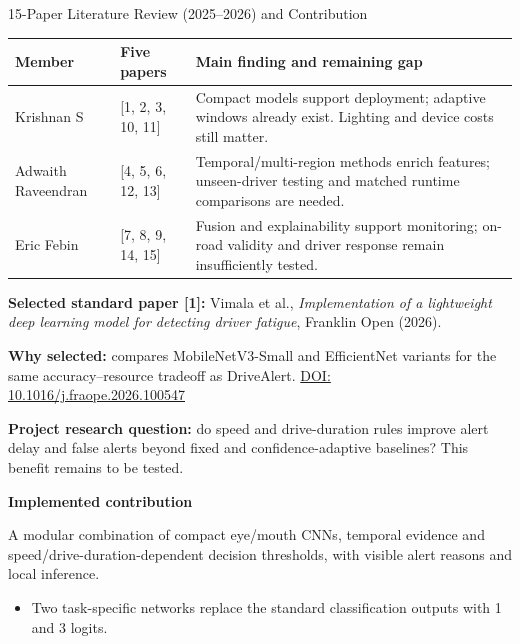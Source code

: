\documentclass[aspectratio=169,10pt]{beamer}
\renewcommand{\arraystretch}{1.22}
\begin{document}
\begin{frame}[t]{15-Paper Literature Review (2025--2026) and Contribution}
\fontsize{10}{11.5}\selectfont
\renewcommand{\arraystretch}{1.06}
\setlength{\tabcolsep}{4pt}
\setlength{\abovedisplayskip}{4pt}
\setlength{\belowdisplayskip}{4pt}
\small
\begin{tabularx}{\textwidth}{L{3cm} L{2.2cm} Y}
\toprule
\textbf{Member} & \textbf{Five papers} & \textbf{Main finding and remaining gap}\\\midrule
Krishnan S & [1, 2, 3, 10, 11] & Compact models support deployment; adaptive windows already exist. Lighting and device costs still matter.\\
Adwaith Raveendran & [4, 5, 6, 12, 13] & Temporal/multi-region methods enrich features; unseen-driver testing and matched runtime comparisons are needed.\\
Eric Febin & [7, 8, 9, 14, 15] & Fusion and explainability support monitoring; on-road validity and driver response remain insufficiently tested.\\\bottomrule
\end{tabularx}
\par\vspace{1pt}
\textbf{Selected standard paper [1]:} Vimala et al., \textit{Implementation of a lightweight deep learning model for detecting driver fatigue}, Franklin Open (2026).\par
\textbf{Why selected:} compares MobileNetV3-Small and EfficientNet variants for the same accuracy--resource tradeoff as DriveAlert. \href{https://doi.org/10.1016/j.fraope.2026.100547}{DOI: 10.1016/j.fraope.2026.100547}
\par\vspace{1pt}
\textbf{Project research question:} do speed and drive-duration rules improve alert delay and false alerts beyond fixed and confidence-adaptive baselines? This benefit remains to be tested.
\par\medskip
\textbf{Implemented contribution}\par\vspace{1pt}
A modular combination of compact eye/mouth CNNs, temporal evidence and speed/drive-duration-dependent decision thresholds, with visible alert reasons and local inference.
\par
\par\vspace{1pt}
\begin{itemize}\setlength\itemsep{0pt}
\item Two task-specific networks replace the standard classification outputs with 1 and 3 logits.

\end{itemize}
\end{frame}
\end{document}
